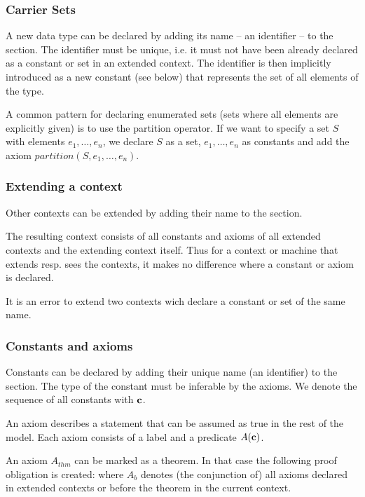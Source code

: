 \subsubsection{Carrier Sets}
\label{sets}
A new data type can be declared by adding its name -- an identifier -- to the  section.
The identifier must be unique, i.e. it must not have been already declared as a constant or set in an extended context.
The identifier is then implicitly introduced as a new constant (see below) that represents the set of all elements of the type. 

A common pattern for declaring enumerated sets (sets where all elements are explicitly given)
is to use the partition operator. If we want to specify a set $S$ with elements $e_1,\ldots,e_n$,
we declare $S$ as a set, $e_1,\ldots,e_n$ as constants and add the axiom $partition(S,e_1,\ldots,e_n)$.

\subsubsection{Extending a context}
Other contexts can be extended by adding their name to the  section.

The resulting context consists of all constants and axioms of all extended contexts and the extending context itself.
Thus for a context or machine that extends resp. sees the contexts, it makes no difference where a constant or axiom is declared.

It is an error to extend two contexts wich declare a constant or set of the same name.

\subsubsection{Constants and axioms}
\label{constants_and_axioms}
Constants can be declared by adding their unique name (an identifier) to the  section.
The type of the constant must be inferable by the axioms.
We denote the sequence of all constants with $\textbf{c}$.

An axiom describes a statement that can be assumed as true in the rest of the model.
Each axiom consists of a label and a predicate $A(\textbf{c})$.

An axiom $A_{thm}$ can be marked as a theorem. In that case the following proof obligation is created:
where $A_b$ denotes (the conjunction of) all axioms declared in extended contexts or before the theorem in the current context.

